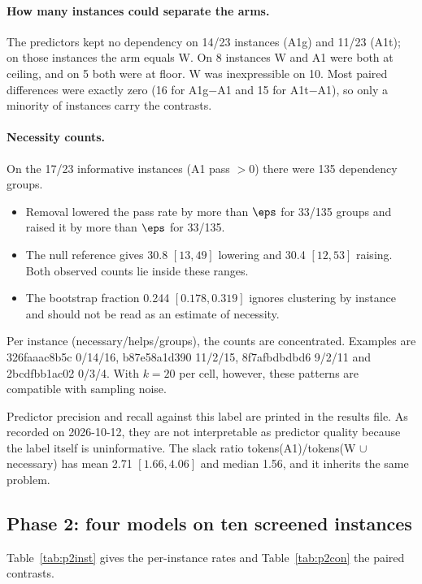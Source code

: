 \paragraph{How many instances could separate the arms.} The predictors kept no dependency on 14/23 instances (A1g) and 11/23 (A1t); on those instances the arm equals W. On 8 instances W and A1 were both at ceiling, and on 5 both were at floor. W was inexpressible on 10. Most paired differences were exactly zero (16 for A1g$-$A1 and 15 for A1t$-$A1), so only a minority of instances carry the contrasts.

\paragraph{Necessity counts.} On the 17/23 informative instances (A1 pass $> 0$) there were 135 dependency groups.
\begin{itemize}
\item Removal lowered the pass rate by more than $\eps$ for 33/135 groups and raised it by more than $\eps$ for 33/135.
\item The null reference gives 30.8 $[13, 49]$ lowering and 30.4 $[12, 53]$ raising. Both observed counts lie inside these ranges.
\item The bootstrap fraction 0.244 $[0.178, 0.319]$ ignores clustering by instance and should not be read as an estimate of necessity.
\end{itemize}

Per instance (necessary/helps/groups), the counts are concentrated. Examples are 326faaac8b5c 0/14/16, b87e58a1d390 11/2/15, 8f7afbdbdbd6 9/2/11 and 2bcdfbb1ac02 0/3/4. With $k=20$ per cell, however, these patterns are compatible with sampling noise.

Predictor precision and recall against this label are printed in the results file. As recorded on 2026-10-12, they are not interpretable as predictor quality because the label itself is uninformative. The slack ratio tokens(A1)/tokens(W $\cup$ necessary) has mean 2.71 $[1.66, 4.06]$ and median 1.56, and it inherits the same problem.

\subsection{Phase 2: four models on ten screened instances}

Table~\ref{tab:p2inst} gives the per-instance rates and Table~\ref{tab:p2con} the paired contrasts.


